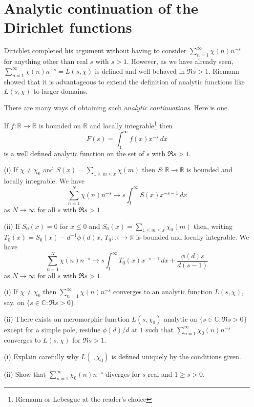 \section{Analytic continuation of the Dirichlet functions}
Dirichlet completed his argument without having to consider
$\sum_{n=1}^{\infty}\chi(n)n^{-s}$ for anything other
than real $s$ with $s>1$. However, as we have already seen,
$\sum_{n=1}^{\infty}\chi(n)n^{-s}=L(s,\chi)$ is defined and well
behaved in $\Re s>1$. Riemann showed that it is advantageous
to extend the definition of analytic
functions like $L(s,\chi)$
to larger domains.

There are many ways of obtaining such 
\emph{analytic continuations}. Here is one.
\begin{lemma} If $f:{\mathbb R}\rightarrow{\mathbb R}$
is bounded on ${\mathbb R}$ and 
locally integrable\footnote{Riemann or Lebesgue at
the reader's choice} then
\[F(s)=\int_{1}^{\infty}f(x)x^{-s}\,dx\]
is a well defined analytic function on the set of $s$ with
$\Re s>1$.
\end{lemma}
\begin{lemma}\label{Extend Dirichlet 1} 
(i) If $\chi\neq \chi_{0}$ and 
$S(x)=\sum_{1\leq m\leq x}\chi(m)$ then 
$S:{\mathbb R}\rightarrow{\mathbb R}$ is bounded
and locally integrable. We have
\[\sum_{n=1}^{N}\chi(n)n^{-s}
\rightarrow s\int_{1}^{\infty}S(x)x^{-s-1}\, dx\]
as $N\rightarrow\infty$ for all $s$ with $\Re s>1$.

(ii) If $S_{0}(x)=0$ for $x\leq 0$ and
$S_{0}(x)=\sum_{1\leq m\leq x}\chi_{0}(m)$ then,
writing $T_{0}(x)=S_{0}(x)-d^{-1}\phi(d)x$, 
$T_{0}:{\mathbb R}\rightarrow{\mathbb R}$ is bounded
and locally integrable. We have
\[\sum_{n=1}^{N}\chi(n)n^{-s}\rightarrow 
s\int_{1}^{\infty}T_{0}(x)x^{-s-1}\, dx+\frac{\phi(d)s}{d(s-1)}\]
as $N\rightarrow\infty$ for all $s$ with $\Re s>1$.
\end{lemma}
\begin{lemma}\label{Extend Dirichlet 2}
(i) If $\chi\neq\chi_{0}$ then 
$\sum_{n=1}^{\infty} \chi(n)n^{-s}$ converges to an analytic
function $L(s,\chi)$, say, on $\{s\in{\mathbb C}:\Re s>0\}$.

(ii) There exists an meromorphic function $L(s,\chi_{0})$
analytic on $\{s\in{\mathbb C}:\Re s>0\}$ except for
a simple pole, residue $\phi(d)/d$ at $1$ such that
$\sum_{n=1}^{\infty} \chi_{0}(n)n^{-s}$ converges to 
$L(s,\chi)$ for $\Re s>1$.
\end{lemma}
\begin{exercise}
(i) Explain carefully why
$L(\ ,\chi_{0})$ is defined uniquely by
the conditions given.

(ii) Show that
$\sum_{n=1}^{\infty} \chi_{0}(n)n^{-s}$ diverges
for $s$ real and $1\geq s >0$.
\end{exercise}

